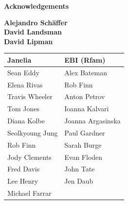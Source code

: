 \documentclass[landscape]{slides}
\begin{document}
\begin{slide}

\large
\begin{center}
\large{\textbf{Acknowledgements}} \\

\vspace{0.5in}

\textbf{Alejandro Sch\"{a}ffer} \\
\textbf{David Landsman} \\
\textbf{David Lipman}

\vspace{0.5in}

\normalsize
\begin{tabular}{l|l}
\textbf{Janelia} & \textbf{EBI (Rfam)} \\ \hline
Sean Eddy           & Alex Bateman \\
Elena Rivas         & Rob Finn \\
Travis Wheeler      & Anton Petrov \\
Tom Jones           & Ioanna Kalvari \\
Diana Kolbe         & Joanna Argasinska \\
Seolkyoung Jung     & Paul Gardner \\
Rob Finn            & Sarah Burge \\ 
Jody Clements       & Evan Floden \\
Fred Davis          & John Tate \\
Lee Henry           & Jen Daub \\
Michael Farrar      & \\
\end{tabular}


\end{center}

\vfill
\end{slide}
\end{document}
